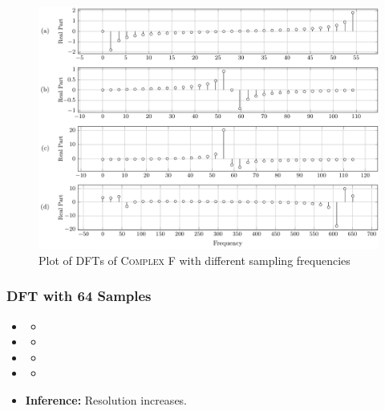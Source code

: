 \documentclass[../../course]{subfiles}
\begin{document}
\vfill

\begin{figure} [H]
    \centering
     {
        \includegraphics[height = 0.8\textheight] {tikzpics/plotDftComplexF32.pdf}
    }
     {Plot of \textsc{DFT}s of \textsc{Complex F} with different sampling frequencies}
    \label{plt:dftComplexF}
\end{figure}

\subsubsection{DFT with 64 Samples}

\begin{itemize} [label=]

    \item \sampFreqMuchLess
        \begin{itemize} [label=]
            \item
        \end{itemize}

    \item \sampFreqNorm
        \begin{itemize} [label=]
            \item
        \end{itemize}

    \item \sampFreqSligGreat
        \begin{itemize} [label=]
            \item
        \end{itemize}

    \item \sampFreqMuchGreat
        \begin{itemize} [label=]
            \item
        \end{itemize}

    \item \textbf{Inference:} Resolution increases.

\end{itemize}
\end{document}
